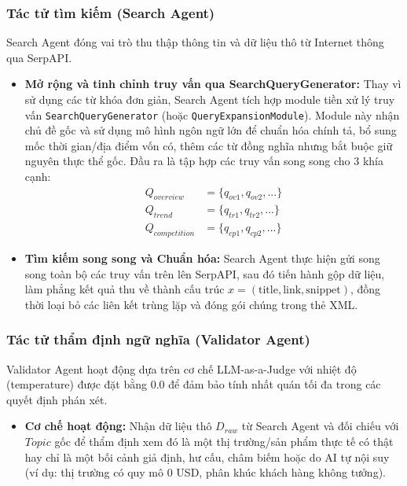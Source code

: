 \documentclass[11pt,a4paper]{article}
\begin{document}
\begin{itemize}
\subsubsection{Tác tử tìm kiếm (Search Agent)}
Search Agent đóng vai trò thu thập thông tin và dữ liệu thô từ Internet thông qua SerpAPI.
\begin{itemize}
    \item \textbf{Mở rộng và tinh chỉnh truy vấn qua SearchQueryGenerator:} Thay vì sử dụng các từ khóa đơn giản, Search Agent tích hợp module tiền xử lý truy vấn \texttt{SearchQueryGenerator} (hoặc \texttt{QueryExpansionModule}). Module này nhận chủ đề gốc và sử dụng mô hình ngôn ngữ lớn để chuẩn hóa chính tả, bổ sung mốc thời gian/địa điểm vốn có, thêm các từ đồng nghĩa nhưng bắt buộc giữ nguyên thực thể gốc. Đầu ra là tập hợp các truy vấn song song cho 3 khía cạnh:
    \begin{align}
        Q_{overview} &= \{q_{ov1}, q_{ov2}, ...\} \\
        Q_{trend} &= \{q_{tr1}, q_{tr2}, ...\} \\
        Q_{competition} &= \{q_{cp1}, q_{cp2}, ...\}
    \end{align}
    \item \textbf{Tìm kiếm song song và Chuẩn hóa:} Search Agent thực hiện gửi song song toàn bộ các truy vấn trên lên SerpAPI, sau đó tiến hành gộp dữ liệu, làm phẳng kết quả thu về thành cấu trúc $x = (\text{title}, \text{link}, \text{snippet})$, đồng thời loại bỏ các liên kết trùng lặp và đóng gói chúng trong thẻ XML.
\end{itemize}

\subsubsection{Tác tử thẩm định ngữ nghĩa (Validator Agent)}
Validator Agent hoạt động dựa trên cơ chế LLM-as-a-Judge với nhiệt độ (temperature) được đặt bằng $0.0$ để đảm bảo tính nhất quán tối đa trong các quyết định phán xét.
\begin{itemize}
    \item \textbf{Cơ chế hoạt động:} Nhận dữ liệu thô $D_{raw}$ từ Search Agent và đối chiếu với $Topic$ gốc để thẩm định xem đó là một thị trường/sản phẩm thực tế có thật hay chỉ là một bối cảnh giả định, hư cấu, châm biếm hoặc do AI tự nội suy (ví dụ: thị trường có quy mô 0 USD, phân khúc khách hàng không tưởng).
\end{itemize}


\end{itemize}
\end{document}
